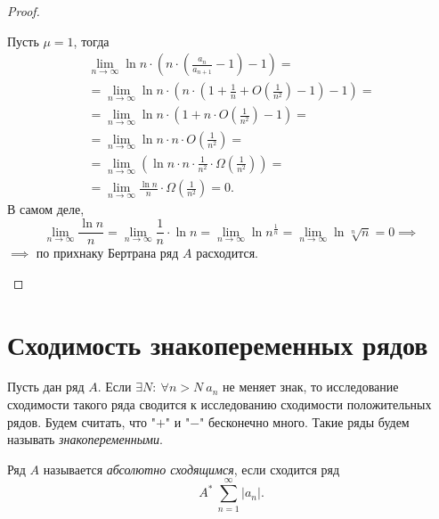 \begin{proof}
\begin{enumerate}
              Пусть $\mu = 1$, тогда
              \begin{multline*}
                  \underset{n\rightarrow\infty}{\lim}\ln n \cdot \left(n \cdot \left(\frac{a_n}{a_{n+1}} - 1\right) - 1\right) = \\
                  = \underset{n\rightarrow\infty}{\lim}\ln n \cdot \left(n \cdot \left(1 + \frac{1}{n} + O\left(\frac{1}{n^2}\right) - 1\right) - 1\right) = \\
                  = \underset{n\rightarrow\infty}{\lim}\ln n \cdot \left(1 + n \cdot O\left(\frac{1}{n^2}\right) - 1\right) = \\
                  = \underset{n\rightarrow\infty}{\lim}\ln n \cdot n \cdot O\left(\frac{1}{n^2}\right) = \\
                  = \underset{n\rightarrow\infty}{\lim}\left(\ln n \cdot n \cdot \frac{1}{n^2} \cdot \Omega\left(\frac{1}{n^2}\right)\right) = \\
                  = \underset{n\rightarrow\infty}{\lim}\frac{\ln n}{n} \cdot \Omega\left(\frac{1}{n^2}\right) = 0.
              \end{multline*}
              В самом деле,
              \[
                  \underset{n\rightarrow\infty}{\lim}\frac{\ln n}{n} = \underset{n\rightarrow\infty}{\lim} \frac{1}{n} \cdot \ln n = \underset{n\rightarrow\infty}{\lim}\ln n^{\frac{1}{n}} = \underset{n\rightarrow\infty}{\lim} \ln \sqrt[n]{n} = 0 \implies
              \]
              $\implies$ по прихнаку Бертрана ряд $A$ расходится.
    \end{enumerate}
\end{proof}

\section{Сходимость знакопеременных рядов}

\begin{note}
    Пусть дан ряд $A$. Если $\exists N: \ \forall n > N \ a_n$ не меняет знак, то исследование сходимости такого ряда сводится к исследованию сходимости положительных рядов. Будем считать, что "$+$" и "$-$" бесконечно много. Такие ряды будем называть \emph{знакопеременными}.
\end{note}

\begin{definition}
    Ряд $A$ называется \emph{абсолютно сходящимся}, если сходится ряд
    \[
        A^* \ \sum_{n=1}^{\infty}|a_n|.
    \]
\end{definition}


